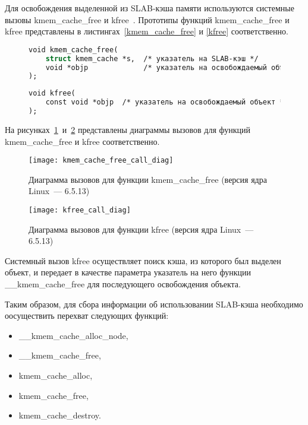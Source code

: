 Для освобождения выделенной из SLAB-кэша памяти используются системные вызовы kmem\_cache\_free и kfree~\cite{slab_info}.
Прототипы функций kmem\_cache\_free и kfree представлены в листингах~\ref{kmem_cache_free} и \ref{kfree} соответственно.
\begin{figure}[H]
	\begin{lstlisting}[label=kmem_cache_free,caption=Прототип функции kmem\_cache\_free (версия ядра Linux~--- 6.5.13),language=Caml]
void kmem_cache_free(
	struct kmem_cache *s,  /* указатель на SLAB-кэш */
	void *objp             /* указатель на освобождаемый объект */
);
	\end{lstlisting}
\end{figure}
\begin{figure}[H]
	\begin{lstlisting}[label=kfree,caption=Прототип функции kfree (версия ядра Linux~--- 6.5.13),language=Caml]
void kfree(
	const void *objp  /* указатель на освобождаемый объект */
);
	\end{lstlisting}
\end{figure}

На рисунках~\ref{kmem_cache_free_call_diag}~и~\ref{kfree_call_diag} представлены диаграммы вызовов для функций kmem\_cache\_free и kfree соответственно.
\begin{figure}[H]
	\centering
	\texttt{[image: kmem\_cache\_free\_call\_diag]}
	\caption{Диаграмма вызовов для функции kmem\_cache\_free (версия ядра Linux~--- 6.5.13)}
	\label{kmem_cache_free_call_diag}
\end{figure}
\begin{figure}[H]
	\centering
	\texttt{[image: kfree\_call\_diag]}
	\caption{Диаграмма вызовов для функции kfree (версия ядра Linux~--- 6.5.13)}
	\label{kfree_call_diag}
\end{figure}

Системный вызов kfree осуществляет поиск кэша, из которого был выделен объект, и передает в качестве параметра указатель на него функции \_\_kmem\_cache\_free для последующего освобождения объекта.

Таким образом, для сбора информации об использовании SLAB-кэша необходимо оосуществить перехват следующих функций:
\begin{itemize}
	\item \_\_kmem\_cache\_alloc\_node,
	\item \_\_kmem\_cache\_free,
	\item kmem\_cache\_alloc,
	\item kmem\_cache\_free,
	\item kmem\_cache\_destroy.
\end{itemize}


